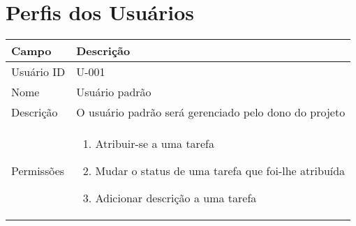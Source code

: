 \vspace{1cm}
\section{Perfis dos Usuários}

\begin{tabularx}{\textwidth}{| l | X |}
\hline
Campo             & Descrição                                                                                                                                                                           \\ \hline
Usuário ID    & U-001                                                                                                                                                                              \\ \hline
Nome              & Usuário padrão                                                                                                                                                                       \\ \hline
Descrição         & O usuário padrão será gerenciado pelo dono do projeto
\\ \hline
Permissões &
\begin{enumerate}
    \item Atribuir-se a uma tarefa
    \item Mudar o status de uma tarefa que foi-lhe atribuída
    \item Adicionar descrição a uma tarefa 
\end{enumerate}
\\ \hline
\end{tabularx}

\vspace{1cm}

